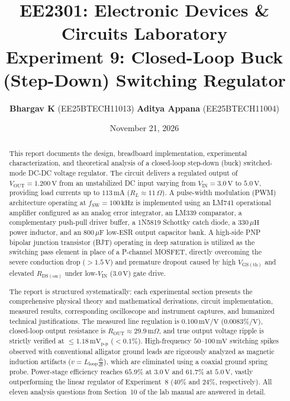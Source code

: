 \documentclass[11pt,a4paper]{article}
\title{\vspace{-1.5cm}\textbf{EE2301: Electronic Devices \& Circuits Laboratory}\\
\Large \textbf{Experiment 9: Closed-Loop Buck (Step-Down) Switching Regulator}\\
\large \text{Design, Implementation, and Verification of a 1.2\,V, 100\,mA DC-DC Converter from a 3.0--5.0\,V Supply}}
\author{\textbf{Bhargav K} (EE25BTECH11013) \qquad \textbf{Aditya Appana} (EE25BTECH11004)}
\date{November 21, 2026}
\begin{document}
\maketitle

\begin{abstract}
This report documents the design, breadboard implementation, experimental characterization, and theoretical analysis of a closed-loop step-down (buck) switched-mode DC-DC voltage regulator. The circuit delivers a regulated output of $V_{\mathrm{OUT}} = 1.200\,\mathrm{V}$ from an unstabilized DC input varying from $V_{\mathrm{IN}} = 3.0\,\mathrm{V}$ to $5.0\,\mathrm{V}$, providing load currents up to $113\,\mathrm{mA}$ ($R_L \approx 11\,\Omega$). A pulse-width modulation (PWM) architecture operating at $f_{\mathrm{SW}} = 100\,\mathrm{kHz}$ is implemented using an LM741 operational amplifier configured as an analog error integrator, an LM339 comparator, a complementary push-pull driver buffer, a 1N5819 Schottky catch diode, a $330\,\mu\mathrm{H}$ power inductor, and an $800\,\mu\mathrm{F}$ low-ESR output capacitor bank. A high-side PNP bipolar junction transistor (BJT) operating in deep saturation is utilized as the switching pass element in place of a P-channel MOSFET, directly overcoming the severe conduction drop ($>1.5\,\mathrm{V}$) and premature dropout caused by high $V_{\mathrm{GS(th)}}$ and elevated $R_{\mathrm{DS(on)}}$ under low-$V_{\mathrm{IN}}$ ($3.0\,\mathrm{V}$) gate drive. 

The report is structured systematically: each experimental section presents the comprehensive physical theory and mathematical derivations, circuit implementation, measured results, corresponding oscilloscope and instrument captures, and humanized technical justifications. The measured line regulation is $0.100\,\mathrm{mV/V}$ ($0.0083\%/\mathrm{V}$), closed-loop output resistance is $R_{\mathrm{OUT}} \approx 29.9\,\mathrm{m}\Omega$, and true output voltage ripple is strictly verified at $\le 1.18\,\mathrm{mV}_{\mathrm{p\text{-}p}}$ ($<0.1\%$). High-frequency $50\text{--}100\,\mathrm{mV}$ switching spikes observed with conventional alligator ground leads are rigorously analyzed as magnetic induction artifacts ($v = L_{\mathrm{loop}}\frac{di}{dt}$), which are eliminated using a coaxial ground spring probe. Power-stage efficiency reaches $65.9\%$ at $3.0\,\mathrm{V}$ and $61.7\%$ at $5.0\,\mathrm{V}$, vastly outperforming the linear regulator of Experiment~8 ($40\%$ and $24\%$, respectively). All eleven analysis questions from Section~10 of the lab manual are answered in detail.
\end{abstract}
\end{document}

